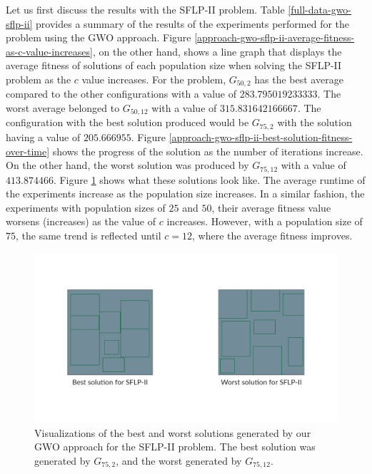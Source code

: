 Let us first discuss the results with the SFLP-II problem. Table \ref{full-data-gwo-sflp-ii} provides a summary of the results of the experiments performed for the problem using the GWO approach. Figure \ref{approach-gwo-sflp-ii-average-fitness-as-c-value-increases}, on the other hand, shows a line graph that displays the average fitness of solutions of each population size when solving the SFLP-II problem as the $c$ value increases. For the problem, $G_{50,2}$ has the best average compared to the other configurations with a value of $283.795019233333$. The worst average belonged to $G_{50,12}$ with a value of $315.831642166667$. The configuration with the best solution produced would be $G_{75,2}$ with the solution having a value of $205.666955$. Figure \ref{approach-gwo-sflp-ii-best-solution-fitness-over-time} shows the progress of the solution as the number of iterations increase. On the other hand, the worst solution was produced by $G_{75,12}$ with a value of $413.874466$. Figure \ref{approach-gwo-sflp-ii-best-and-worst-solutions-visualization} shows what these solutions look like. The average runtime of the experiments increase as the population size increases. In a similar fashion, the experiments with population sizes of $25$ and $50$, their average fitness value worsens (increases) as the value of $c$ increases. However, with a population size of $75$, the same trend is reflected until $c = 12$, where the average fitness improves.

\begin{figure}[h!]
\centering
\begin{adjustwidth}{-0.45in}{}
	\includegraphics[scale=1.0]{./images/chap07-rd/gwo-sflp2-best-and-worst-solutions.png}
\end{adjustwidth}
\caption{Visualizations of the best and worst solutions generated by our GWO approach for the SFLP-II problem. The best solution was generated by $G_{75,2}$, and the worst generated by $G_{75,12}$.}
\label{approach-gwo-sflp-ii-best-and-worst-solutions-visualization}
\end{figure}

